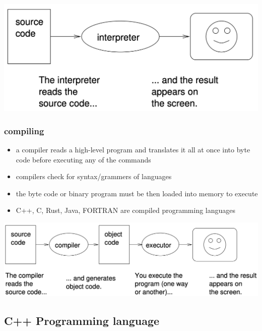 \documentclass[11pt]{article}
\providecommand{\tightlist}{%
      \setlength{\itemsep}{0pt}\setlength{\parskip}{0pt}}
\begin{document}
\includegraphics{resources/Intrepreter.png}

\hypertarget{compiling}{%
\subsubsection{compiling}\label{compiling}}

\begin{itemize}
\tightlist
\item
  a compiler reads a high-level program and translates it all at once
  into byte code before executing any of the commands
\item
  compilers check for syntax/grammers of languages
\item
  the byte code or binary program must be then loaded into memory to
  execute
\item
  C++, C, Rust, Java, FORTRAN are compiled programming languages
\end{itemize}

\includegraphics{resources/Compiler.png}

\hypertarget{c-programming-language}{%
\subsection{C++ Programming language}\label{c-programming-language}}
\end{document}
